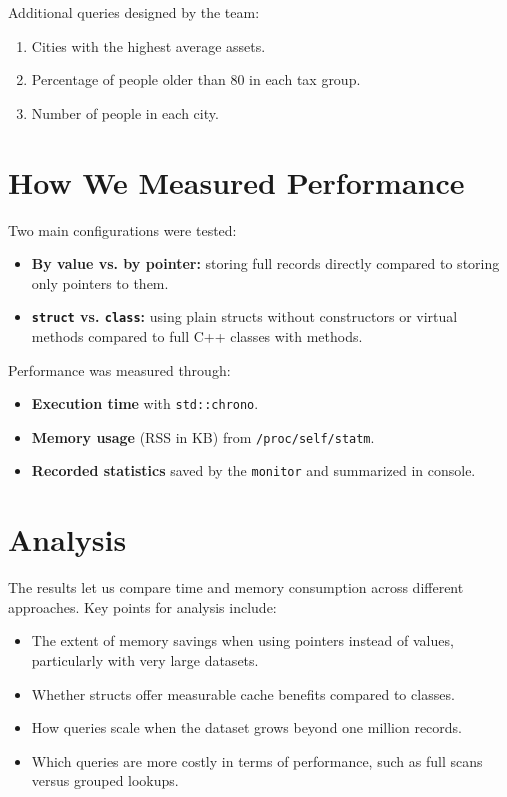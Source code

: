 \documentclass[11pt,letterpaper,oneside]{article}
\begin{document}
Additional queries designed by the team:
\begin{enumerate}
    \item Cities with the highest average assets.
    \item Percentage of people older than 80 in each tax group.
    \item Number of people in each city.
\end{enumerate}

\section{How We Measured Performance}

Two main configurations were tested:
\begin{itemize}
    \item \textbf{By value vs. by pointer:} storing full records directly
    compared to storing only pointers to them.
    \item \textbf{\texttt{struct} vs. \texttt{class}:} using plain structs
    without constructors or virtual methods compared to full C++ classes with
    methods.
\end{itemize}

Performance was measured through:
\begin{itemize}
    \item \textbf{Execution time} with \texttt{std::chrono}.
    \item \textbf{Memory usage} (RSS in KB) from \texttt{/proc/self/statm}.
    \item \textbf{Recorded statistics} saved by the \texttt{monitor} and
    summarized in console.
\end{itemize}

\section{Analysis}

The results let us compare time and memory consumption across different
approaches. Key points for analysis include:
\begin{itemize}
    \item The extent of memory savings when using pointers instead of values,
    particularly with very large datasets.
    \item Whether structs offer measurable cache benefits compared to classes.
    \item How queries scale when the dataset grows beyond one million records.
    \item Which queries are more costly in terms of performance, such as full
    scans versus grouped lookups.
\end{itemize}
\end{document}
